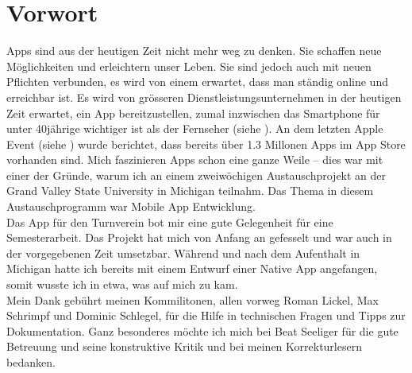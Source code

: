 \chapter*{Vorwort}\label{vorwort}

Apps sind aus der heutigen Zeit nicht mehr weg zu denken. Sie schaffen neue Möglichkeiten und erleichtern unser Leben. Sie sind jedoch auch mit neuen Pflichten verbunden, es wird von einem erwartet, dass man ständig online und erreichbar ist. Es wird von grösseren Dienstleistungsunternehmen in der heutigen Zeit erwartet, ein App bereitzustellen, zumal inzwischen das Smartphone für unter 40jährige wichtiger ist als der Fernseher (siehe \cite{digitalisierungsbericht2014}). An dem letzten Apple Event (siehe \cite{apple_event_sept_2014}) wurde berichtet, dass bereits über 1.3 Millonen Apps im App Store vorhanden sind. Mich faszinieren Apps schon eine ganze Weile -- dies war mit einer der Gründe, warum ich an einem zweiwöchigen Austauschprojekt an der Grand Valley State University in Michigan teilnahm. Das Thema in diesem Austauschprogramm war Mobile App Entwicklung.\\

Das App für den Turnverein bot mir eine gute Gelegenheit für eine Semesterarbeit. Das Projekt hat mich von Anfang an gefesselt und war auch in der vorgegebenen Zeit umsetzbar. Während und nach dem Aufenthalt in Michigan hatte ich bereits mit einem Entwurf einer Native App angefangen, somit wusste ich in etwa, was auf mich zu kam.\\

Mein Dank gebührt meinen Kommilitonen, allen vorweg Roman Lickel, Max Schrimpf und Dominic Schlegel, für die Hilfe in technischen Fragen und Tipps zur Dokumentation. Ganz besonderes möchte ich mich bei Beat Seeliger für die gute Betreuung und seine konstruktive Kritik und bei meinen Korrekturlesern bedanken.
